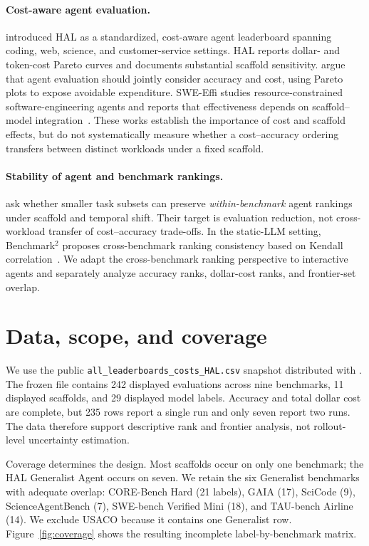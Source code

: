 \documentclass{article}
\begin{document}
\paragraph{Cost-aware agent evaluation.}
\citet{kapoor2026hal} introduced HAL as a standardized, cost-aware agent leaderboard spanning coding, web, science, and customer-service settings. HAL reports dollar- and token-cost Pareto curves and documents substantial scaffold sensitivity. \citet{agentsmatter2024} argue that agent evaluation should jointly consider accuracy and cost, using Pareto plots to expose avoidable expenditure. SWE-Effi studies resource-constrained software-engineering agents and reports that effectiveness depends on scaffold--model integration~\citep{sweeffi2025}. These works establish the importance of cost and scaffold effects, but do not systematically measure whether a cost--accuracy ordering transfers between distinct workloads under a fixed scaffold.

\paragraph{Stability of agent and benchmark rankings.}
\citet{ndzomga2026efficient} ask whether smaller task subsets can preserve \emph{within-benchmark} agent rankings under scaffold and temporal shift. Their target is evaluation reduction, not cross-workload transfer of cost--accuracy trade-offs. In the static-LLM setting, Benchmark$^2$ proposes cross-benchmark ranking consistency based on Kendall correlation~\citep{qian2026benchmark2}. We adapt the cross-benchmark ranking perspective to interactive agents and separately analyze accuracy ranks, dollar-cost ranks, and frontier-set overlap.

\section{Data, scope, and coverage}
\label{sec:data}

We use the public \texttt{all\_leaderboards\_costs\_HAL.csv} snapshot distributed with \citet{ndzomga2026efficient}. The frozen file contains 242 displayed evaluations across nine benchmarks, 11 displayed scaffolds, and 29 displayed model labels. Accuracy and total dollar cost are complete, but 235 rows report a single run and only seven report two runs. The data therefore support descriptive rank and frontier analysis, not rollout-level uncertainty estimation.

Coverage determines the design. Most scaffolds occur on only one benchmark; the HAL Generalist Agent occurs on seven. We retain the six Generalist benchmarks with adequate overlap: CORE-Bench Hard (21 labels), GAIA (17), SciCode (9), ScienceAgentBench (7), SWE-bench Verified Mini (18), and TAU-bench Airline (14). We exclude USACO because it contains one Generalist row. Figure~\ref{fig:coverage} shows the resulting incomplete label-by-benchmark matrix.
\end{document}

